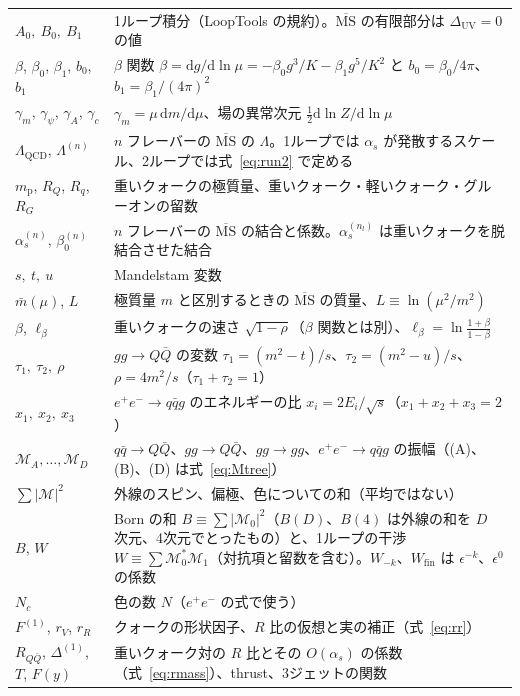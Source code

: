 \documentclass[a4paper,10pt]{ltjsarticle}
\newcommand{\dd}{\mathrm{d}}
\newcommand{\MSbar}{\overline{\mathrm{MS}}}
\newcommand{\DUV}{\Delta_{\mathrm{UV}}}
\begin{document}
\begin{table}[tbp]
\begin{tabularx}{\linewidth}{>{\raggedright\arraybackslash}p{3.9cm}X}
$A_0,\ B_0,\ B_1$ & 1ループ積分（LoopTools の規約）。$\MSbar$ の有限部分は $\DUV=0$ の値 \\
$\beta$, $\beta_0$, $\beta_1$, $b_0$, $b_1$ & $\beta$ 関数 $\beta=\dd g/\dd\ln\mu=-\beta_0g^3/K-\beta_1g^5/K^2$ と $b_0=\beta_0/4\pi$、$b_1=\beta_1/(4\pi)^2$ \\
$\gamma_m$, $\gamma_\psi$, $\gamma_A$, $\gamma_c$ & $\gamma_m=\mu\,\dd m/\dd\mu$、場の異常次元 $\frac12\dd\ln Z/\dd\ln\mu$ \\
$\Lambda_{\mathrm{QCD}}$, $\Lambda^{(n)}$ & $n$ フレーバーの $\MSbar$ の $\Lambda$。1ループでは $\alpha_s$ が発散するスケール、2ループでは式~\eqref{eq:run2} で定める \\
$m_{\mathrm p}$, $R_Q$, $R_q$, $R_G$ & 重いクォークの極質量、重いクォーク・軽いクォーク・グルーオンの留数 \\
$\alpha_s^{(n)}$, $\beta_0^{(n)}$ & $n$ フレーバーの $\MSbar$ の結合と係数。$\alpha_s^{(n_l)}$ は重いクォークを脱結合させた結合 \\
\midrule
$s,\ t,\ u$ & Mandelstam 変数 \\
$\bar m(\mu)$, $L$ & 極質量 $m$ と区別するときの $\MSbar$ の質量、$L\equiv\ln(\mu^2/m^2)$ \\
$\beta$, $\ell_\beta$ & 重いクォークの速さ $\sqrt{1-\rho}$（$\beta$ 関数とは別）、$\ell_\beta=\ln\frac{1+\beta}{1-\beta}$ \\
$\tau_1,\ \tau_2,\ \rho$ & $gg\to Q\bar Q$ の変数 $\tau_1=(m^2-t)/s$、$\tau_2=(m^2-u)/s$、$\rho=4m^2/s$（$\tau_1+\tau_2=1$） \\
$x_1,\ x_2,\ x_3$ & $e^+e^-\to q\bar qg$ のエネルギーの比 $x_i=2E_i/\sqrt s$（$x_1+x_2+x_3=2$） \\
$\mathcal M_A,\dots,\mathcal M_D$ & $q\bar q\to Q\bar Q$、$gg\to Q\bar Q$、$gg\to gg$、$e^+e^-\to q\bar qg$ の振幅（(A)、(B)、(D) は式~\eqref{eq:Mtree}） \\
$\sum|\mathcal M|^2$ & 外線のスピン、偏極、色についての和（平均ではない） \\
$B$, $W$ & Born の和 $B\equiv\sum|\mathcal M_0|^2$（$B(D)$、$B(4)$ は外線の和を $D$ 次元、4次元でとったもの）と、1ループの干渉 $W\equiv\sum\mathcal M_0^*\mathcal M_1$（対抗項と留数を含む）。$W_{-k}$、$W_{\mathrm{fin}}$ は $\epsilon^{-k}$、$\epsilon^0$ の係数 \\
$N_c$ & 色の数 $N$（$e^+e^-$ の式で使う） \\
$F^{(1)}$, $r_V$, $r_R$ & クォークの形状因子、$R$ 比の仮想と実の補正（式~\eqref{eq:rr}） \\
$R_{Q\bar Q}$, $\Delta^{(1)}$, $T$, $F(y)$ & 重いクォーク対の $R$ 比とその $O(\alpha_s)$ の係数（式~\eqref{eq:rmass}）、thrust、3ジェットの関数 \\

\end{tabularx}
\end{table}
\end{document}
